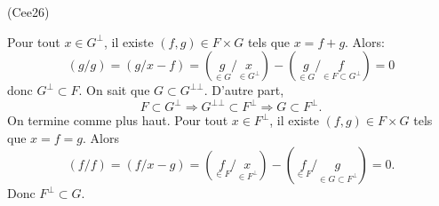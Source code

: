 \begin{tiny}(Cee26)\end{tiny} Pour tout $x\in G^\bot$, il existe $(f,g)\in F \times G$ tels que $x=f+g$. Alors:
\[
 (g/g) = (g/ x - f) = (\underset{\in G}{g}/ \underset{\in G^\bot}{x}) - (\underset{\in G}{g}/ \underset{\in F \subset G^\bot}{f})
 = 0 
\]
donc $G^\bot \subset F$. On sait que $G \subset G^{\bot \bot}$. D'autre part,
\[
 F \subset G^\bot \Rightarrow G^{\bot \bot} \subset F^\bot \Rightarrow G \subset F^\bot.
\]
On termine comme plus haut. Pour tout $x\in F^\bot$, il existe $(f,g)\in F\times G$ tels que $x=f=g$. Alors
\[
 (f/f) = (f/ x - g) = (\underset{\in F}{f}/ \underset{\in F^\bot}{x}) - (\underset{\in F}{f}/ \underset{\in G \subset F^\bot}{g})
 = 0 .
\]
Donc $F^\bot \subset G$.